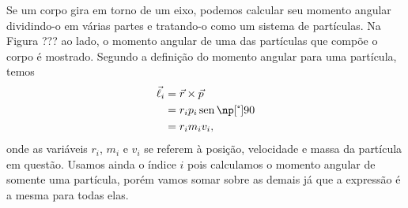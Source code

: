 Se um corpo gira em torno de um eixo, podemos calcular seu momento angular dividindo-o em várias partes e tratando-o como um sistema de partículas. Na Figura ??? ao lado, o momento angular de uma das partículas que compõe o corpo é mostrado. Segundo a definição do momento angular para uma partícula, temos
\begin{align}
  \vec{\ell}_i &= \vec{r}\times\vec{p} \\
  &= r_i p_i \sen \degree{90} \\
  &= r_i m_i v_i,
\end{align}
%
onde as variáveis $r_i$, $m_i$ e $v_i$ se referem à posição, velocidade e massa da partícula em questão. Usamos ainda o índice $i$ pois calculamos o momento angular de somente uma partícula, porém vamos somar sobre as demais já que a expressão é a mesma para todas elas.

